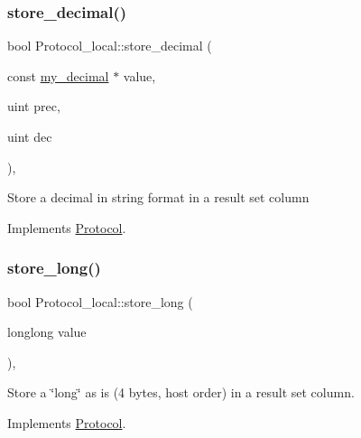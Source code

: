 \mbox{\label{classProtocol__local_a9586dbbd838cbcef1f9cc79296712a62}} 
\subsubsection{\texorpdfstring{store\+\_\+decimal()}{store\_decimal()}}
{\footnotesize\ttfamily bool Protocol\+\_\+local\+::store\+\_\+decimal (\begin{DoxyParamCaption}\item[{const \mbox{\hyperlink{classmy__decimal}{my\+\_\+decimal}} $\ast$}]{value,  }\item[{uint}]{prec,  }\item[{uint}]{dec }\end{DoxyParamCaption})\hspace{0.3cm}{\ttfamily [protected]}, {\ttfamily [virtual]}}

Store a decimal in string format in a result set column 

Implements \mbox{\hyperlink{classProtocol}{Protocol}}.

\mbox{\label{classProtocol__local_a2ec95fb26eb13927aa85989e6431db9d}} 
\subsubsection{\texorpdfstring{store\+\_\+long()}{store\_long()}}
{\footnotesize\ttfamily bool Protocol\+\_\+local\+::store\+\_\+long (\begin{DoxyParamCaption}\item[{longlong}]{value }\end{DoxyParamCaption})\hspace{0.3cm}{\ttfamily [protected]}, {\ttfamily [virtual]}}

Store a \char`\"{}long\char`\"{} as is (4 bytes, host order) in a result set column. 

Implements \mbox{\hyperlink{classProtocol}{Protocol}}.

\mbox{\label{classProtocol__local_ae912b2b1882bef0b4140be5bbcee976e}} 
